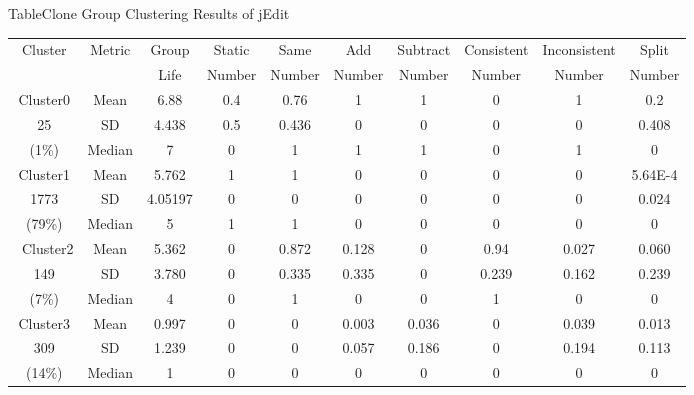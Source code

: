 {\begin{table}[htbp]
{Table$\!$}{Clone Group Clustering Results of jEdit}
\vspace{0.5em}
\centering
\footnotesize
\begin{tabular}{cccccccccc}
\toprule[1.5pt]
\multirow{2}{*}{Cluster}&\multirow{2}{*}{Metric}&Group&Static &Same &Add &Subtract &Consistent &	Inconsistent &Split \\ 
&&Life& Number& Number& Number& Number& Number&	 Number& Number\\ 
\midrule[1pt]
Cluster0&	Mean	&6.88	&0.4	&0.76	&1	&1	&0	&1	&0.2\\ \cline{2-10}
25	&SD&4.438	&0.5	&0.436	&0	&0	&0	&0	&0.408\\ \cline{2-10}
(1\%)	&Median	&7	&0	&1	&1	&1	&0	&1	&0\\ \hline
Cluster1	&Mean	&5.762	&1	&1	&0	&0	&0	&0	&5.64E-4\\ \cline{2-10}
1773	&SD&4.05197	&0	&0	&0	&0	&0	&0	&0.024\\ \cline{2-10}
(79\%)&	Median&	5	&1&	1&	0&	0&	0&	0&	0\\ \hline\
Cluster2	&Mean	&5.362&	0&	0.872&	0.128&	0&	0.94&	0.027&	0.060\\\cline{2-10}
149&	SD&	3.780&	0&	0.335&	0.335&	0&	0.239 &	0.162 &	0.239 \\ 
\cline{2-10}
(7\%)&	Median&	4&	0&	1&	0&	0&	1&	0&	0\\ \hline
Cluster3	&Mean	&0.997&	0&	0	&0.003&0.036	&0	&0.039	&0.013\\ 
\cline{2-10}
309	&SD&1.239&0	&0	&0.057&0.186&0	&0.194&0.113\\ 
\cline{2-10}
(14\%)&	Median&	1&	0&	0&	0&	0&	0&	0&	0\\ 
\bottomrule[1.5pt]
\end{tabular}
\end{table}


}
